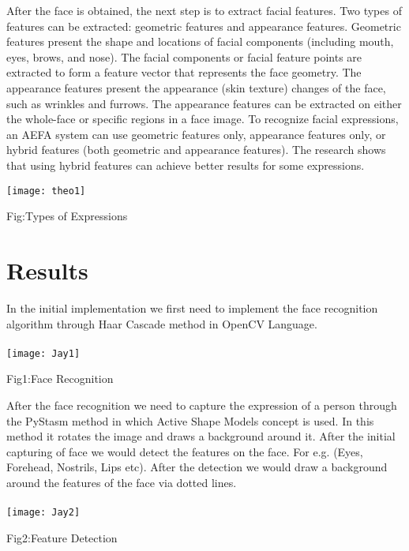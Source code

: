 \documentclass[journal]{IEEEtran}
\begin{document}
 After the face is obtained, the next step is to extract facial features. Two types of features can be extracted: geometric features and appearance features. Geometric features present the shape and locations of facial components (including mouth, eyes, brows, and nose). The facial components or facial feature points are extracted to form a feature vector that represents the face geometry. The appearance features present the appearance (skin texture) changes of the face, such as wrinkles and furrows. The appearance features can be extracted on either the whole-face or specific regions in a face image. To recognize facial expressions, an AEFA system can use geometric features only, appearance features only, or hybrid features (both geometric and appearance features). The research shows that using hybrid features can achieve better results for some expressions. 

{\texttt{[image: theo1]}}
\begin{center}
Fig:Types of Expressions
\end{center}




\section{Results}
In the initial implementation we first need to implement the face recognition algorithm through Haar Cascade method in OpenCV Language. \\ \\
{\texttt{[image: Jay1]}}
\begin{center}
Fig1:Face Recognition
\end{center}

After the face recognition we need to capture the expression of a person through the PyStasm method in which Active Shape Models concept is used. In this method it rotates the image and draws a background around it. After the initial capturing of face we would detect the features on the face. For e.g. (Eyes, Forehead, Nostrils, Lips etc). After the detection we would draw a background around the features of the face via dotted lines. \\ \\
{\texttt{[image: Jay2]}}
\begin{center}
Fig2:Feature Detection
\end{center}
\end{document}
